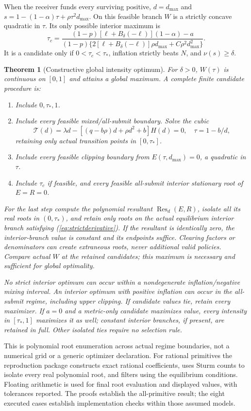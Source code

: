 \documentclass[11pt]{article}
\newtheorem{theorem}{Theorem}
\begin{document}
When the receiver funds every surviving positive, $d=d_{\max}$ and $s=1-(1-\alpha)\tau+\rho\tau^2d_{\max}$. On this feasible branch $W$ is a strictly concave quadratic in $\tau$. Its only possible interior maximum is
\begin{equation}
\tau_c=\frac{(1-p)[\ell+B_\delta(-\ell)](1-\alpha)-a}{(1-p)\{2[\ell+B_\delta(-\ell)]\rho d_{\max}+C\rho^2d_{\max}^2\}}.\label{eq:clippeak}
\end{equation}
It is a candidate only if $0<\tau_c<\tau_*$, inflation strictly beats $N$, and $\nu(s)\geq\delta$.

\begin{theorem}[Constructive global intensity optimum]\label{thm:random_opt}
For $\delta>0$, $W(\tau)$ is continuous on $[0,1]$ and attains a global maximum. A complete finite candidate procedure is:
\begin{enumerate}
\item Include $0,\tau_*,1$.
\item Include every feasible mixed/all-submit boundary. Solve the cubic
\begin{equation}\mathcal T(d)=\lambda d-[(q-b\rho)d+\rho d^2+b]H(d)=0,\quad \tau=1-b/d,\label{eq:transitionpoly}
\end{equation}
retaining only actual transition points in $[0,\tau_*]$.
\item Include every feasible clipping boundary from $E(\tau,d_{\max})=0$, a quadratic in $\tau$.
\item Include $\tau_c$ if feasible, and every feasible all-submit interior stationary root of $E=R=0$.
\end{enumerate}
For the last step compute the polynomial resultant $\operatorname{Res}_d(E,R)$, isolate all its real roots in $(0,\tau_*)$, and retain only roots on the actual equilibrium interior branch satisfying (\ref{eq:strictderivative}). If the resultant is identically zero, the interior-branch value is constant and its endpoints suffice. Clearing factors or denominators can create extraneous roots, never additional valid policies. Compare actual $W$ at the retained candidates; this maximum is necessary and sufficient for global optimality.

No strict interior optimum can occur within a nondegenerate inflation/negative mixing interval. An interior optimum with positive inflation can occur in the all-submit regime, including upper clipping. If candidate values tie, retain every maximizer. If $a=0$ and a metric-only candidate maximizes value, every intensity in $[\tau_*,1]$ maximizes it as well; constant interior branches, if present, are retained in full. Other isolated ties require no selection rule.
\end{theorem}
This is polynomial root enumeration across actual regime boundaries, not a numerical grid or a generic optimizer declaration. For rational primitives the reproduction package constructs exact rational coefficients, uses Sturm counts to isolate every real polynomial root, and filters using the equilibrium conditions. Floating arithmetic is used for final root evaluation and displayed values, with tolerances reported. The proofs establish the all-primitive result; the eight executed cases establish implementation checks within those assumed models.
\end{document}
